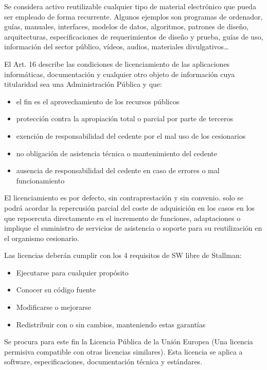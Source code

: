         Se considera activo reutilizable cualquier tipo de material electrónico que pueda ser empleado de forma recurrente. Algunos ejemplos son programas de ordenador, guías, manuales, interfaces, modelos de datos, algoritmos, patrones de diseño, arquitecturas, especificaciones de requerimientos de diseño y prueba, guías de uso, información del sector público, vídeos, audios, materiales divulgativos\dots

        El Art. 16 describe las condiciones de licenciamiento de las aplicaciones informáticas, documentación y cualquier otro objeto de información cuya titularidad sea una Administración Pública y que:
        \begin{itemize}
            \item el fin es el aprovechamiento de los recursos públicos
            \item protección contra la apropiación total o parcial por parte de terceros
            \item exención de responsabilidad del cedente por el mal uso de los cesionarios
            \item no obligación de asistencia técnica o mantenimiento del cedente
            \item ausencia de responsabilidad del cedente en caso de errores o mal funcionamiento
        \end{itemize}

        El licenciamiento es por defecto, sin contraprestación y sin convenio. solo se podrá acordar la repercusión parcial del coste de adquisición en los casos en los que repoercuta directamente en el incremento de funciones, adaptaciones o implique el suministro de servicios de asistencia o soporte para su reutilización en el organismo cesionario.

        Las licencias deberán cumplir con los 4 requisitos de SW libre de Stallman:
        \begin{itemize}
            \item Ejecutarse para cualquier propósito
            \item Conocer su código fuente
            \item Modificarse o mejorarse
            \item Redistribuir con o sin cambios, manteniendo estas garantías
        \end{itemize}

        Se procura para este fin la Licencia Pública de la Unión Europea (Una licencia permisiva compatible con otras licencias similares). Esta licencia se aplica a software, especificaciones, documentación técnica y estándares.

